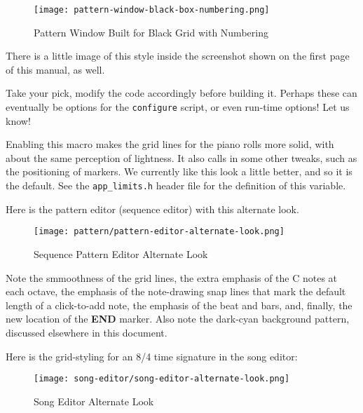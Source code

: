 \begin{figure}[H]
   \centering 
   \texttt{[image: pattern-window-black-box-numbering.png]}
   \caption{Pattern Window Built for Black Grid with Numbering}
   \label{fig:seq64_build_black_box_numbering}
\end{figure}

      There is a little image of this style inside the screenshot shown on
      the first page of this manual, as well.

      Take your pick, modify the code accordingly before building it.
      Perhaps these can eventually be options for the \texttt{configure}
      script, or even run-time options!  Let us know!

        Enabling this macro makes the grid lines for the piano rolls
        more solid, with about the same perception of lightness.
        It also calls in some other tweaks, such as the positioning of
        markers.  We currently like this look a little better, and so it is
        the default.  See the \texttt{app\_limits.h}
        header file for the definition of this variable.

        Here is the pattern editor (sequence editor) with this alternate look.

\begin{figure}[H]
   \centering 
   \texttt{[image: pattern/pattern-editor-alternate-look.png]}
   \caption{Sequence Pattern Editor Alternate Look}
   \label{fig:seq64_pattern_editor_alternate_look}
\end{figure}

        Note the smmoothness of the grid lines, the extra emphasis of the C
        notes at each octave, the emphasis of the note-drawing snap lines that
        mark the default length of a click-to-add note, the emphasis of the
        beat and bars, and, finally, the new location of the
        \textbf{END} marker.  Also note the dark-cyan background pattern,
        discussed elsewhere in this document.

        Here is the grid-styling for an 8/4 time signature in the song editor:

\begin{figure}[H]
   \centering 
   \texttt{[image: song-editor/song-editor-alternate-look.png]}
   \caption{Song Editor Alternate Look}
   \label{fig:seq64_song_editor_alternate_look}
\end{figure}


